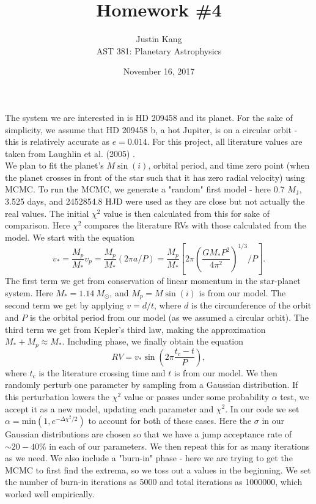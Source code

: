 \documentclass[12pt]{article}
\title{\vspace{-2.5em} \Large \textbf{Homework \#4}}
\author{Justin Kang \\ AST 381: Planetary Astrophysics}
\date{\vspace{-0.75em} November 16, 2017}
\begin{document}
\maketitle

\noindent The system we are interested in is HD 209458 and its planet. For the sake of simplicity, we assume that HD 209458 b, a hot Jupiter, is on a circular orbit - this is relatively accurate as $e = 0.014$. For this project, all literature values are taken from Laughlin et al. (2005) \cite{rvdata}.\\
\indent We plan to fit the planet's $M\sin(i)$, orbital period, and time zero point (when the planet crosses in front of the star such that it has zero radial velocity) using MCMC. 
To run the MCMC, we generate a "random" first model - here 0.7 $M_\text{J}$, 3.525 days, and 2452854.8 HJD were used as they are close but not actually the real values. The initial $\chi^{2}$ value is then calculated from this for sake of comparison. Here $\chi^{2}$ compares the literature RVs with those calculated from the model. We start with the equation $$v_{*} = \frac{M_{p}}{M_{*}}v_{p} = \frac{M_{p}}{M_{*}}\left(2\pi{a}/P\right) = \frac{M_{p}}{M_{*}}\left[2\pi\left(\frac{GM_{*}P^{2}}{4\pi^{2}}\right)^{1/3}/P\right].$$ The first term we get from conservation of linear momentum in the star-planet system. Here $M_{*} = 1.14\ M_{\odot}$, and $M_{p} = M\sin(i)$ is from our model. The second term we get by applying $v = d/t$, where $d$ is the circumference of the orbit and $P$ is the orbital period from our model (as we assumed a circular orbit). The third term we get from Kepler's third law, making the approximation $M_{*} + M_{p} \approx M_{*}$. Including phase, we finally obtain the equation $$RV = v_{*}\sin\left(2\pi\frac{t_{c}-t}{P}\right),$$ where $t_{c}$ is the literature crossing time and $t$ is from our model. We then randomly perturb one parameter by sampling from a Gaussian distribution. If this perturbation lowers the $\chi^{2}$ value or passes under some probability $\alpha$ test, we accept it as a new model, updating each parameter and $\chi^{2}$. In our code we set $\alpha = \text{min}\left(1, e^{-\Delta\chi^{2}/2}\right)$ to account for both of these cases. Here the $\sigma$ in our Gaussian distributions are chosen so that we have a jump acceptance rate of $\sim20-40\%$ in each of our parameters. We then repeat this for as many iterations as we need. We also include a "burn-in" phase - here we are trying to get the MCMC to first find the extrema, so we toss out a values in the beginning. We set the number of burn-in iterations as 5000 and total iterations as 1000000, which worked well empirically.\\
\end{document}
